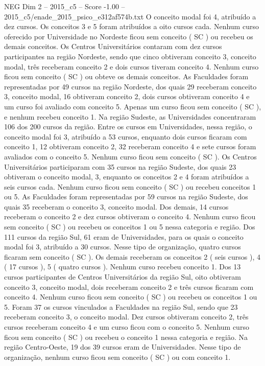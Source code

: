 \begin{textsample}{NEG Dim 2 – 2015\_c5 – Score -1.00 – 2015\_c5/enade\_2015\_psico\_e312af574b.txt}
O conceito modal foi 4, atribuído a dez cursos.
Os conceitos 3 e 5 foram atribuídos a oito cursos cada.
Nenhum curso oferecido por Universidade no Nordeste ficou sem conceito ( SC ) ou recebeu os demais conceitos.
Os Centros Universitários contaram com dez cursos participantes na região Nordeste, sendo que cinco obtiveram conceito 3, conceito modal, três receberam conceito 2 e dois cursos tiveram conceito 4.
Nenhum curso ficou sem conceito ( SC ) ou obteve os demais conceitos.
As Faculdades foram representadas por 49 cursos na região Nordeste, dos quais 29 receberam conceito 3, conceito modal, 16 obtiveram conceito 2, dois cursos obtiveram conceito 4 e um curso foi avaliado com conceito 5.
Apenas um curso ficou sem conceito ( SC ), e nenhum recebeu conceito 1.
Na região Sudeste, as Universidades concentraram 106 dos 200 cursos da região.
Entre os cursos em Universidades, nessa região, o conceito modal foi 3, atribuído a 53 cursos, enquanto dois cursos ficaram com conceito 1, 12 obtiveram conceito 2, 32 receberam conceito 4 e sete cursos foram avaliados com o conceito 5.
Nenhum curso ficou sem conceito ( SC ).
Os Centros Universitários participaram com 35 cursos na região Sudeste, dos quais 23 obtiveram o conceito modal, 3, enquanto os conceitos 2 e 4 foram atribuídos a seis cursos cada.
Nenhum curso ficou sem conceito ( SC ) ou recebeu conceitos 1 ou 5.
As Faculdades foram representadas por 59 cursos na região Sudeste, dos quais 35 receberam o conceito 3, conceito modal.
Dos demais, 14 cursos receberam o conceito 2 e dez cursos obtiveram o conceito 4.
Nenhum curso ficou sem conceito ( SC ) ou recebeu os conceitos 1 ou 5 nessa categoria e região.
Dos 111 cursos da região Sul, 61 eram de Universidades, para os quais o conceito modal foi 3, atribuído a 30 cursos.
Nesse tipo de organização, quatro cursos ficaram sem conceito ( SC ).
Os demais receberam os conceitos 2 ( seis cursos ), 4 ( 17 cursos ), 5 ( quatro cursos ).
Nenhum curso recebeu conceito 1.
Dos 13 cursos participantes de Centros Universitários da região Sul, oito obtiveram conceito 3, conceito modal, dois receberam conceito 2 e três cursos ficaram com conceito 4.
Nenhum curso ficou sem conceito ( SC ) ou recebeu os conceitos 1 ou 5.
Foram 37 os cursos vinculados a Faculdades na região Sul, sendo que 23 receberam conceito 3, o conceito modal.
Dez cursos obtiveram conceito 2, três cursos receberam conceito 4 e um curso ficou com o conceito 5.
Nenhum curso ficou sem conceito ( SC ) ou recebeu o conceito 1 nessa categoria e região.
Na região Centro-Oeste, 19 dos 39 cursos eram de Universidades.
Nesse tipo de organização, nenhum curso ficou sem conceito ( SC ) ou com conceito 1.

\end{textsample}
